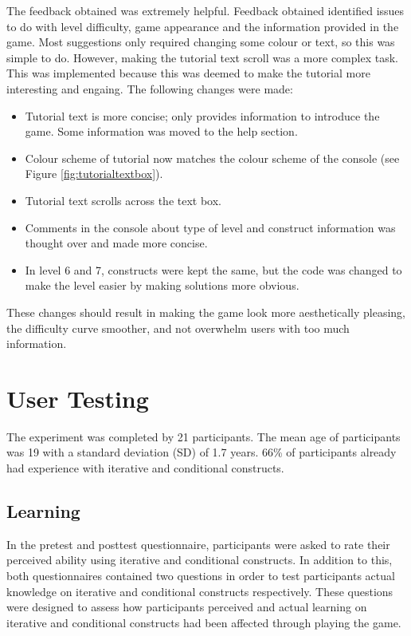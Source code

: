 \documentclass[a4paper,11.5pt]{report}
\numberwithin{figure}{section}
\numberwithin{table}{section}
\numberwithin{equation}{section}
\numberwithin{equation}{section}
\begin{document}
The feedback obtained was extremely helpful. Feedback obtained identified issues to do with level difficulty, game appearance and the information provided in the game. Most suggestions only required changing some colour or text, so this was simple to do. However, making the tutorial text scroll was a more complex task. This was implemented because this was deemed to make the tutorial more interesting and engaing. The following changes were made:

\begin{itemize}
	\item Tutorial text is more concise; only provides information to introduce the game. Some information was moved to the help section.
	\item Colour scheme of tutorial now matches the colour scheme of the console (see Figure \ref{fig:tutorialtextbox}).
	\item Tutorial text scrolls across the text box.
	\item Comments in the console about type of level and construct information was thought over and made more concise.
	\item In level 6 and 7, constructs were kept the same, but the code was changed to make the level easier by making solutions more obvious.
\end{itemize}

These changes should result in making the game look more aesthetically pleasing, the difficulty curve smoother, and not overwhelm users with too much information.


\section{User Testing}



The experiment was completed by 21 participants. The mean age of participants was 19 with a standard deviation (SD) of 1.7 years. 66\% of participants already had experience with iterative and conditional constructs.



\subsection{Learning}

In the pretest and posttest questionnaire, participants were asked to rate their perceived ability using iterative and conditional constructs. In addition to this, both questionnaires contained two questions in order to test participants actual knowledge on iterative and conditional constructs respectively. These questions were designed to assess how participants perceived and actual learning on iterative and conditional constructs had been affected through playing the game.
\end{document}
